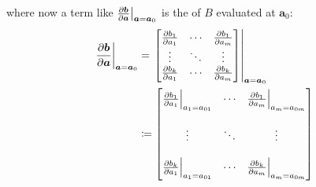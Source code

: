 %
where now a term like \(\evalat[\big]{\pdv{\bm{b}}{\bm{a}}}{\bm{a}=\bm{a}_0}\) is the  of \(B\) evaluated at \(\bm{a}_0\):
%
\begin{align*}
    \evalat[\bigg]{\pdv{\bm{b}}{\bm{a}}}{\bm{a}=\bm{a}_0}
     & = \evalat*{
        \begin{bmatrix}
            \pdv{b_1}{a_1} & \cdots & \pdv{b_1}{a_m} \\
            \vdots         & \ddots & \vdots         \\
            \pdv{b_k}{a_1} & \cdots & \pdv{b_k}{a_m}
        \end{bmatrix}
    }{\bm{a}=\bm{a}_0} \\
     & \coloneqq
    \begin{bmatrix}
        \evalat[\Big]{\pdv{b_1}{a_1}}{a_1 = a_{01}} & \cdots & \evalat[\Big]{\pdv{b_1}{a_m}}{a_m = a_{0m}} \\
        \\
        \vdots                                      & \ddots & \vdots                                      \\
        \\
        \evalat[\Big]{\pdv{b_k}{a_1}}{a_1 = a_{01}} & \cdots & \evalat[\Big]{\pdv{b_k}{a_m}}{a_m = a_{0m}} \\
    \end{bmatrix}
\end{align*}
%

